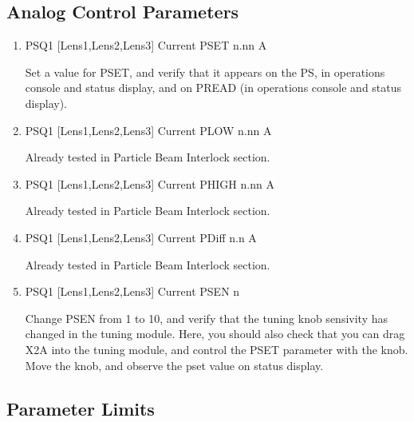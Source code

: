 \documentclass[11pt]{book}		%
\begin{document}
\color{black}


\subsection{Analog Control Parameters}\label{sect:cyc-equip-ctl-beamline-quad1-analog-control}

\begin{enumerate}
 \item PSQ1 [Lens1,Lens2,Lens3] Current PSET  n.nn A

\color{red}
Set a value for PSET, and verify that it appears on the PS, in operations console and status display, and on PREAD (in operations console and status display).
\color{black}

 \item PSQ1 [Lens1,Lens2,Lens3] Current PLOW  n.nn A

\color{red}
Already tested in Particle Beam Interlock section.
\color{black}

 \item PSQ1 [Lens1,Lens2,Lens3] Current PHIGH n.nn A

\color{red}
Already tested in Particle Beam Interlock section.
\color{black}

 \item PSQ1 [Lens1,Lens2,Lens3] Current PDiff n.n A

\color{red}
Already tested in Particle Beam Interlock section.
\color{black}

 \item PSQ1 [Lens1,Lens2,Lens3] Current PSEN  n

\color{red}

Change PSEN from 1 to 10, and verify that the tuning knob sensivity has changed in the tuning module. Here, you should also check that you can drag X2A into the tuning module, and control the PSET parameter with the knob. Move the knob, and observe the pset value on status display.

\color{black}

\end{enumerate}

\subsection{Parameter Limits} \label{sect:cyc-equip-ctl-beamline-quad1-analog-control-limits}
\end{document}
